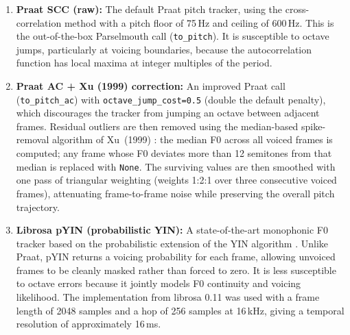\begin{enumerate}

\item \textbf{Praat SCC (raw):} The default Praat pitch tracker, using the
      cross-correlation method with a pitch floor of 75\,Hz and ceiling of
      600\,Hz. This is the out-of-the-box Parselmouth call (\texttt{to\_pitch}).
      It is susceptible to octave jumps, particularly at voicing boundaries,
      because the autocorrelation function has local maxima at integer multiples
      of the period.

\item \textbf{Praat AC + Xu (1999) correction:} An improved Praat call
      (\texttt{to\_pitch\_ac}) with \texttt{octave\_jump\_cost=0.5} (double the
      default penalty), which discourages the tracker from jumping an octave
      between adjacent frames. Residual outliers are then removed using the
      median-based spike-removal algorithm of Xu~(1999) \cite{xu1999}: the median
      F0 across all voiced frames is computed; any frame whose F0 deviates more
      than 12 semitones from that median is replaced with \texttt{None}. The
      surviving values are then smoothed with one pass of triangular weighting
      (weights 1:2:1 over three consecutive voiced frames), attenuating
      frame-to-frame noise while preserving the overall pitch trajectory.

\item \textbf{Librosa pYIN (probabilistic YIN):} A state-of-the-art monophonic
      F0 tracker based on the probabilistic extension of the YIN algorithm
      \cite{mauch2014pyin}. Unlike Praat, pYIN returns a voicing probability for
      each frame, allowing unvoiced frames to be cleanly masked rather than
      forced to zero. It is less susceptible to octave errors because it jointly
      models F0 continuity and voicing likelihood. The implementation from
      librosa 0.11 \cite{mcfee2015librosa} was used with a frame length of 2048
      samples and a hop of 256 samples at 16\,kHz, giving a temporal resolution
      of approximately 16\,ms.


\end{enumerate}
